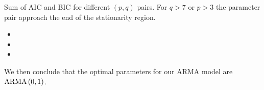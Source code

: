 \begin{table}[H]
    \begin{center}
    \end{center}
    \caption{Sum of AIC and BIC for different $(p,q)$ pairs. For $q > 7$ or $p > 3$ the parameter pair approach the end of the stationarity region.}
    \label{S2:tab_sum}
\end{table}

\begin{itemize}
    \item 
    \item 
    \item 
\end{itemize}

We then conclude that the optimal parameters for our ARMA model are $\text{ARMA}\left(0,1\right)$.